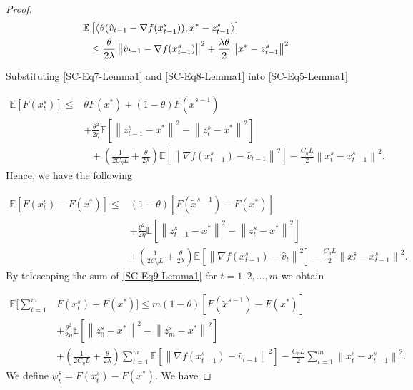 \documentclass{article}
\newcommand*{\E}{\mathbb{E}}
\newcommand{\norm}[1]{\left\lVert#1\right\rVert}
\newcommand{\Iprod}[2]{\left\langle #1,#2\right\rangle}
\theoremstyle{definition}
\theoremstyle{remark}
\begin{document}
{\begin{proof}
\begin{align}
\E&\left[\Iprod{\theta(\hat{v}_{t-1}-\nabla f(x_{t-1}^s))}{x^* - z_{t-1}^s}\right]\notag \\
&\leq \frac{\theta}{2\lambda} \norm{\hat{v}_{t-1}-\nabla f(x_{t-1}^s)}^2+\frac{\lambda\theta}{2}\norm{x^* - z_{t-1}^s}^2\label{SC-Eq8-Lemma1}
\end{align}

Substituting \eqref{SC-Eq7-Lemma1} and \eqref{SC-Eq8-Lemma1} into \eqref{SC-Eq5-Lemma1}

\begin{equation}
\begin{split}
\E[F(x_{t}^s)] \leq &\theta F(x^*)+(1-\theta)F(\widetilde{x}^{s-1})\\
&+ {\frac{\theta^2}{2\eta}}\E[\norm{z_{t-1}^s-x^*}^2-\norm{z_{t}^s-x^*}^2]\\
&~~~+(\frac{1}{2C_{\eta} L}+\frac{\theta}{2\lambda})\E\left[\norm{\nabla f(x_{t-1}^s)-\hat{v}_{t-1}}^2\right]-\frac{C_{\eta} L}{2}\norm{x_{t}^s-x_{t-1}^s}^2. 
\end{split}
\end{equation}
Hence, we have the following

\begin{equation}\label{SC-Eq9-Lemma1}
\begin{split}
\E[F(x_{t}^s)-F(x^*)] \leq &(1-\theta)[F(\widetilde{x}^{s-1})-F(x^*)] \\
&+ {\frac{ \theta^2}{2\eta}}\E[\norm{z_{t-1}^s-x^*}^2-\norm{z_{t}^s-x^*}^2]\\
&+(\frac{1}{2C_{\eta} L}+\frac{\theta}{2\lambda})\E\left[\norm{\nabla f(x_{t-1}^s)-\hat{v}_{t}}^2\right]-\frac{C_{\eta} L}{2}\norm{x_{t}^s-x_{t-1}^s}^2. 
\end{split}
\end{equation}
By telescoping the sum of \eqref{SC-Eq9-Lemma1} for $t = 1, 2, \ldots, m$ we obtain

\begin{equation}
\begin{split}
\E[\sum_{t=1}^{m}&F(x_{t}^s)-F(x^*)] \leq  m(1-\theta)[F(\widetilde{x}^{s-1})-F(x^*)] \\
&+ {\frac{ \theta^2}{2\eta}}\E[\norm{z_{0}^s-x^*}^2-\norm{z_{m}^s-x^*}^2]\\
&+(\frac{1}{2C_{\eta} L}+\frac{\theta}{2\lambda})\sum_{t=1}^{m}\E\left[\norm{\nabla f(x_{t-1}^s)-\hat{v}_{t-1}}^2\right]-\frac{C_{\eta} L}{2}\sum_{t=1}^{m}\norm{x_{t}^s-x_{t-1}^s}^2. 
\end{split}
\end{equation}
We define $\psi_t^s = F({x}^s_t)-F(x^*)$. We have


\end{proof}}
\end{document}

